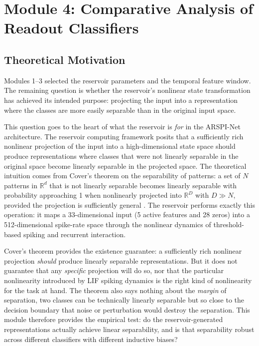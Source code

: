 \section{Module 4: Comparative Analysis of Readout Classifiers}
\label{sec:module4}

\subsection{Theoretical Motivation}

Modules 1--3 selected the reservoir parameters and the temporal feature window. The remaining question is whether the reservoir's nonlinear state transformation has achieved its intended purpose: projecting the input into a representation where the classes are more easily separable than in the original input space.

This question goes to the heart of what the reservoir is \emph{for} in the ARSPI-Net architecture. The reservoir computing framework posits that a sufficiently rich nonlinear projection of the input into a high-dimensional state space should produce representations where classes that were not linearly separable in the original space become linearly separable in the projected space. The theoretical intuition comes from Cover's theorem on the separability of patterns: a set of $N$ patterns in $\mathbb{R}^d$ that is not linearly separable becomes linearly separable with probability approaching 1 when nonlinearly projected into $\mathbb{R}^D$ with $D \gg N$, provided the projection is sufficiently general \cite{Cover1965}. The reservoir performs exactly this operation: it maps a 33-dimensional input (5 active features and 28 zeros) into a 512-dimensional spike-rate space through the nonlinear dynamics of threshold-based spiking and recurrent interaction.

Cover's theorem provides the existence guarantee: a sufficiently rich nonlinear projection \emph{should} produce linearly separable representations. But it does not guarantee that any \emph{specific} projection will do so, nor that the particular nonlinearity introduced by LIF spiking dynamics is the right kind of nonlinearity for the task at hand. The theorem also says nothing about the \emph{margin} of separation, two classes can be technically linearly separable but so close to the decision boundary that noise or perturbation would destroy the separation. This module therefore provides the empirical test: do the reservoir-generated representations actually achieve linear separability, and is that separability robust across different classifiers with different inductive biases?

